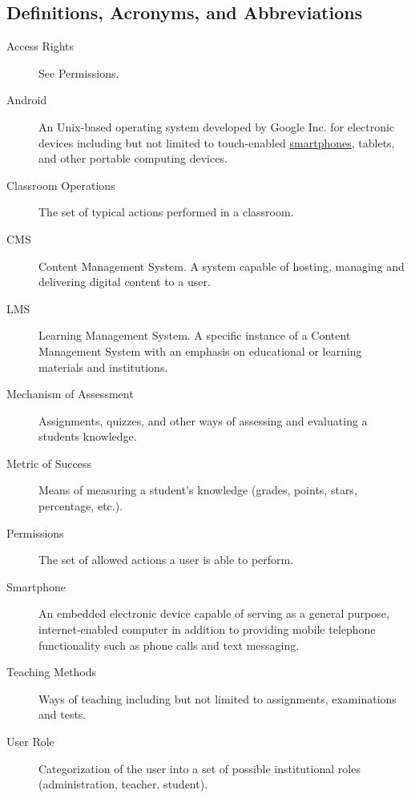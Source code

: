 \documentclass[]{article}
\begin{document}
\subsection{Definitions, Acronyms, and Abbreviations}
\label{sub:definitions_acronyms_and_abbreviations}
\begin{description}
  \item [Access Rights] See Permissions.

  \item [Android] An Unix-based operating system developed by Google Inc. for
    electronic devices including but not limited to touch-enabled
    \underline{smartphones},
    tablets, and other portable computing devices.

  \item [Classroom Operations] The set of typical actions performed in a
    classroom.

  \item [CMS] Content Management System. A system capable of hosting, managing
	and delivering digital content to a user.

  \item [LMS] Learning Management System. A specific instance of a Content
    Management System with an emphasis on educational or learning materials and
    institutions.

  \item [Mechanism of Assessment] Assignments, quizzes, and other ways of
    assessing and evaluating a students knowledge.

  \item [Metric of Success] Means of measuring a student's knowledge (grades,
    points, stars, percentage, etc.).

  \item [Permissions] The set of allowed actions a user is able to perform.

  \item [Smartphone] An embedded electronic device capable of serving as a
    general purpose, internet-enabled computer in addition to providing mobile
    telephone functionality such as phone calls and text messaging.

  \item [Teaching Methods] Ways of teaching including but not limited to
    assignments, examinations and tests.

  \item [User Role] Categorization of the user into a set of possible
    institutional roles (administration, teacher, student).


\end{description}
\end{document}
